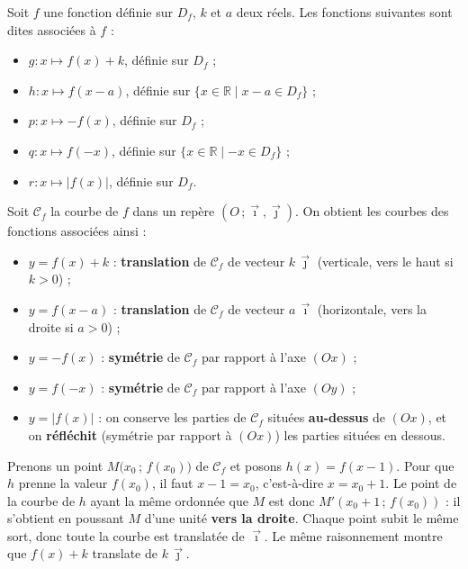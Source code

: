 \documentclass[11pt]{article}
\newcommand{\cle}[1]{{\popxbold\color{popdark}#1}}
\begin{document}
\begin{definition}
Soit $f$ une fonction définie sur $D_f$, $k$ et $a$ deux réels. Les fonctions suivantes sont dites \cle{associées} à $f$ :
\begin{itemize}
\item $g : x \mapsto f(x) + k$, définie sur $D_f$ ;
\item $h : x \mapsto f(x - a)$, définie sur $\{x \in \mathbb{R} \mid x - a \in D_f\}$ ;
\item $p : x \mapsto -f(x)$, définie sur $D_f$ ;
\item $q : x \mapsto f(-x)$, définie sur $\{x \in \mathbb{R} \mid -x \in D_f\}$ ;
\item $r : x \mapsto |f(x)|$, définie sur $D_f$.
\end{itemize}
\end{definition}

\begin{propriete}
Soit $\mathcal{C}_f$ la courbe de $f$ dans un repère $(O\,;\vec{\imath},\vec{\jmath})$. On obtient les courbes des fonctions associées ainsi :
\begin{itemize}
\item $y = f(x) + k$ : \textbf{translation} de $\mathcal{C}_f$ de vecteur $k\,\vec{\jmath}$ (verticale, vers le haut si $k>0$) ;
\item $y = f(x - a)$ : \textbf{translation} de $\mathcal{C}_f$ de vecteur $a\,\vec{\imath}$ (horizontale, vers la droite si $a>0$) ;
\item $y = -f(x)$ : \textbf{symétrie} de $\mathcal{C}_f$ par rapport à l'axe $(Ox)$ ;
\item $y = f(-x)$ : \textbf{symétrie} de $\mathcal{C}_f$ par rapport à l'axe $(Oy)$ ;
\item $y = |f(x)|$ : on conserve les parties de $\mathcal{C}_f$ situées \textbf{au-dessus} de $(Ox)$, et on \textbf{réfléchit} (symétrie par rapport à $(Ox)$) les parties situées en dessous.
\end{itemize}
\end{propriete}

\begin{experience}
Prenons un point $M\big(x_0\,;\,f(x_0)\big)$ de $\mathcal{C}_f$ et posons $h(x) = f(x-1)$. Pour que $h$ prenne la valeur $f(x_0)$, il faut $x - 1 = x_0$, c'est-à-dire $x = x_0 + 1$. Le point de la courbe de $h$ ayant la même ordonnée que $M$ est donc $M'(x_0+1\,;\,f(x_0))$ : il s'obtient en poussant $M$ d'une unité \textbf{vers la droite}. Chaque point subit le même sort, donc toute la courbe est translatée de $\vec{\imath}$. Le même raisonnement montre que $f(x)+k$ translate de $k\,\vec{\jmath}$.
\end{experience}
\end{document}
